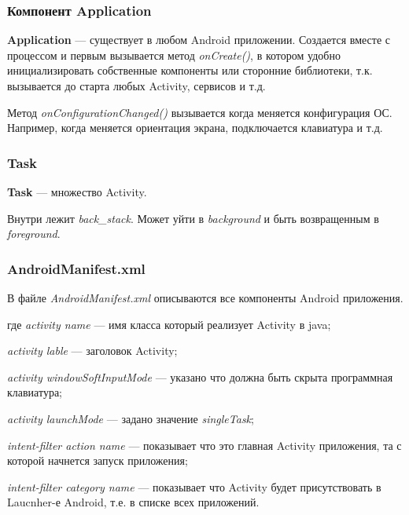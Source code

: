 \subsubsection{Компонент Application}
\textbf{Application} --- существует в любом Android приложении. 
Создается вместе с процессом и первым вызывается метод \textit{onCreate()}, в котором удобно инициализировать собственные компоненты или сторонние библиотеки, т.к. вызывается до старта любых Activity, сервисов и т.д.

Метод \textit{onConfigurationChanged()} вызывается когда меняется конфигурация ОС. Например, когда меняется ориентация экрана, подключается клавиатура и т.д.


\subsubsection{Task}
\textbf{Task} --- множество Activity.  

Внутри лежит \textit{back\_stack}. Может уйти в \textit{background} и быть возвращенным в \textit{foreground}. 


\subsubsection{AndroidManifest.xml}

В файле \textit{AndroidManifest.xml} описываются все компоненты Android приложения.
 


\begin{ESKDexplanation}
\item[где ] \textit{activity name} --- имя класса который реализует Activity в java;
\item \textit{activity lable} --- заголовок Activity;
\item \textit{activity windowSoftInputMode} --- указано что должна быть скрыта программная клавиатура;
\item \textit{activity launchMode} --- задано значение \textit{singleTask};
\item \textit{intent-filter action name} --- показывает что это главная Activity приложения, та с которой начнется запуск приложения;
\item \textit{intent-filter category name} --- показывает что Activity будет присутствовать в Laucnher-е Android, т.е. в списке всех приложений.
\end{ESKDexplanation}

